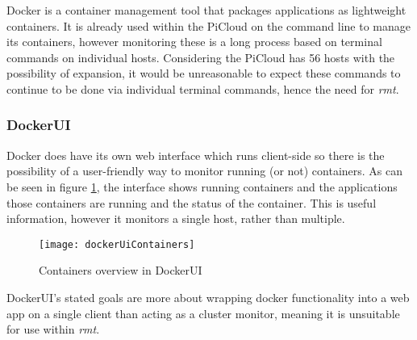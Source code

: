 Docker \citep{docker} is a container management tool that packages applications as lightweight containers.
It is already used within the PiCloud on the command line to manage its containers, however monitoring these is a long process based on terminal commands on individual hosts.
Considering the PiCloud has 56 hosts with the possibility of expansion, it would be unreasonable to expect these commands to continue to be done via individual terminal commands, hence the need for \emph{rmt}.
 
 \subsubsection{DockerUI}
 Docker does have its own web interface which runs client-side so there is the possibility of a user-friendly way to monitor running (or not) containers.
 As can be seen in figure \ref{fig:dockerUiContainers}, the interface shows running containers and the applications those containers are running and the status of the container.
 This is useful information, however it monitors a single host, rather than multiple.

 \begin{figure}[t]
 	\centering
 	\texttt{[image: dockerUiContainers]}
 	\caption{Containers overview in DockerUI}
 	\label{fig:dockerUiContainers}
 \end{figure}

 DockerUI's stated goals are more about wrapping docker functionality into a web app on a single client than acting as a cluster monitor, meaning it is unsuitable for use within \emph{rmt}.
